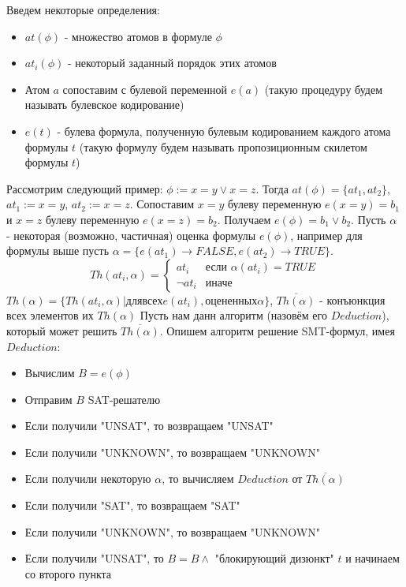 \documentclass[a4paper,12pt]{article}
\begin{document}
Введем некоторые определения:
\begin{itemize}
\item $at(\phi)$ - множество атомов в формуле $\phi$
\item $at_i(\phi)$ - некоторый заданный порядок этих атомов
\item Атом $a$ сопоставим с булевой переменной $e(a)$ (такую процедуру будем называть булевское кодирование)
\item $e(t)$ - булева формула, полученную булевым кодированием каждого атома формулы $t$ (такую формулу будем называть
пропозиционным скилетом формулы $t$)
\end{itemize}
Рассмотрим следующий пример: $\phi := x = y \vee x = z$. Тогда $at(\phi) = \{at_1, at_2\}$, $at_1 := x = y$, $at_2 := x = z$.
Сопоставим $x = y$ булеву переменную $e(x = y) = b_1$ и $x = z$ булеву переменную $e(x = z) = b_2$. Получаем
$e(\phi) = b_1 \vee b_2$.\newline
Пусть $\alpha$ - некоторая (возможно, частичная) оценка формулы $e(\phi)$, например для формулы выше пусть $\alpha = \{e(at_1)
\rightarrow FALSE, e(at_2) \rightarrow TRUE\}$.\newline
\begin{equation*}
Th(at_i, \alpha) =
\begin{cases}
at_i &\text{если $\alpha(at_i) = TRUE$}\\
\lnot at_i &\text{иначе}
\end{cases}
\end{equation*}
$Th(\alpha) = \{Th(at_i, \alpha)| для всех e(at_i), оцененных \alpha\}$, $\overline{Th(\alpha)}$ - конъюнкция всех элементов их
$Th(\alpha)$\newline
Пусть нам данн алгоритм (назовём его $Deduction$), который может решить $\overline{Th(\alpha)}$. Опишем алгоритм решение
SMT-формул, имея $Deduction$:\newline
\begin{itemize}
\item Вычислим $B = e(\phi)$
\item Отправим $B$ SAT-решателю
\item Если получили "UNSAT", то возвращаем "UNSAT"
\item Если получили "UNKNOWN", то возвращаем "UNKNOWN"
\item Если получили некоторую $\alpha$, то вычисляем $Deduction$ от $\overline{Th(\alpha)}$
\item Если получили "SAT", то возвращаем "SAT"
\item Если получили "UNKNOWN", то возвращаем "UNKNOWN"
\item Если получили "UNSAT", то $B = B \wedge$ "блокирующий дизюнкт" $t$ и начинаем со второго пункта
\end{itemize}
\end{document}
